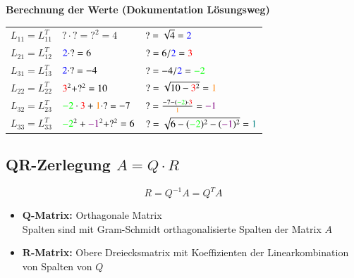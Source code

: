 \vspace{0.2cm}
		
\textbf{Berechnung der Werte (Dokumentation Lösungsweg)}
\vspace{0.2cm}
		
\renewcommand{\arraystretch}{1.4}
\begin{tabular}{lll}
	$L_{11} = L_{11}^T$ & $? \cdot ? = ?^2 = 4$ 							& $? = \sqrt{4} = {\color{blue}2}$ 												\\ 
	$L_{21} = L_{12}^T$ & ${\color{blue}2} \cdot ? = 6$ 							& $? = 6 / {\color{blue}2} = {\color{red}3} $ 											\\
	$L_{31} = L_{13}^T$ & ${\color{blue}2} \cdot ? = -4$ 							& $? = -4 / {\color{blue}2} = {\color{green}-2} $ 										\\
	$L_{22} = L_{22}^T$ & ${\color{red}3}^2 + ?^2 = 10$ 							& $? = \sqrt{10 - {\color{red}3}^2 } = {\color{orange}1}$ 								\\	
	$L_{32} = L_{23}^T$ & $ {\color{green}-2} \cdot {\color{red}3} + {\color{orange}1} \cdot ? = -7 $ & $? = \frac{-7 - ({\color{green}-2}) \cdot {\color{red}3}}{{\color{orange}1}} = {\color{violet}-1} $ 		\\	
	$L_{33} = L_{33}^T$ & ${\color{green}-2}^2 + {\color{violet}-1}^2 + ?^2 = 6 $ 				& $ ? = \sqrt{6 - ({\color{green}-2})^2 - ({\color{violet}-1})^2} = \textcolor{teal}{1}$ 			
\end{tabular}
\renewcommand{\arraystretch}{1}


\subsection[QR-Zerlegung]{QR-Zerlegung $A = Q \cdot R$}

\vspace{-0.2cm}
$$ R = Q^{-1} A = Q^T A $$  

\begin{itemize}
	\item \textbf{$\bm{Q}$-Matrix:} Orthagonale Matrix \\
		Spalten sind mit Gram-Schmidt orthagonalisierte Spalten der Matrix $A$
	\item \textbf{$\bm{R}$-Matrix:} Obere Dreiecksmatrix mit Koeffizienten der Linearkombination von Spalten von $Q$
\end{itemize}		

		

